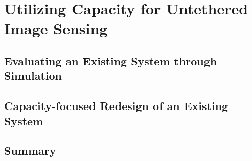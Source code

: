 \chapter{Utilizing Capacity for Untethered Image Sensing}
\label{cha:permacam}

\section{Evaluating an Existing System through Simulation}

\section{Capacity-focused Redesign of an Existing System}


\section{Summary}